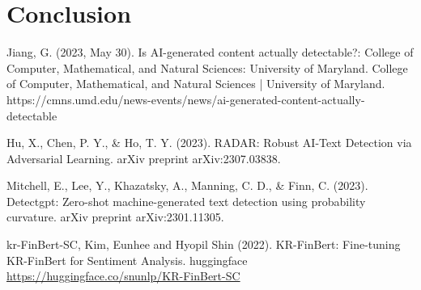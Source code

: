 \documentclass{article}
\begin{document}
\section{Conclusion}



Jiang, G. (2023, May 30). Is AI-generated content actually detectable?: College of Computer, Mathematical, and Natural Sciences: University of Maryland. College of Computer, Mathematical, and Natural Sciences | University of Maryland. https://cmns.umd.edu/news-events/news/ai-generated-content-actually-detectable 

Hu, X., Chen, P. Y., \& Ho, T. Y. (2023). RADAR: Robust AI-Text Detection via Adversarial Learning. arXiv preprint arXiv:2307.03838.

Mitchell, E., Lee, Y., Khazatsky, A., Manning, C. D., \& Finn, C. (2023). Detectgpt: Zero-shot machine-generated text detection using probability curvature. arXiv preprint arXiv:2301.11305.

kr-FinBert-SC, Kim, Eunhee and Hyopil Shin (2022). KR-FinBert: Fine-tuning KR-FinBert for Sentiment Analysis. huggingface \url{https://huggingface.co/snunlp/KR-FinBert-SC}
\end{document}
